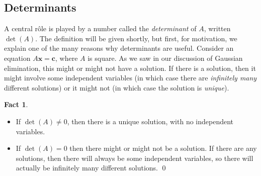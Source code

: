 \documentclass[a4paper]{book}
\newcommand{\RED}[1]{{\color{red}#1}}
\newcommand{\PURPLE}[1]{{\color{purple}#1}}
\newcommand{\VEC}[1]    {\mathbf{#1}}
\renewcommand{\:}{\colon}
\newcommand{\EMPH}[1]{\RED{\emph{#1}}}
\newcommand{\DEFN}[1]{\PURPLE{\emph{#1}}}
\theoremstyle{definition}
\newtheorem{fact}[theorem]{Fact}
\begin{document}
\subsection{Determinants}

A central r\^ole is played by a number called the \DEFN{determinant}
of $A$, written $\det(A)$.  The definition will be given shortly, but
first, for motivation, we explain one of the many reasons why
determinants are useful.  Consider an equation $A\VEC{x}=\VEC{c}$,
where $A$ is square.  As we saw in our discussion of Gaussian
elimination, this might or might not have a solution.  If there is a
solution, then it might involve some independent variables (in which
case there are \EMPH{infinitely many} different solutions) or it might
not (in which case the solution is \EMPH{unique}).
\begin{fact}
 \begin{itemize}
  \item If $\det(A)\neq 0$, then there is a unique solution, with no
   independent variables.
  \item If $\det(A)=0$ then there might or might not be a solution.
   If there are any solutions, then there will always be some
   independent variables, so there will actually be infinitely many
   different solutions. \qed
 \end{itemize}
\end{fact}
\end{document}
